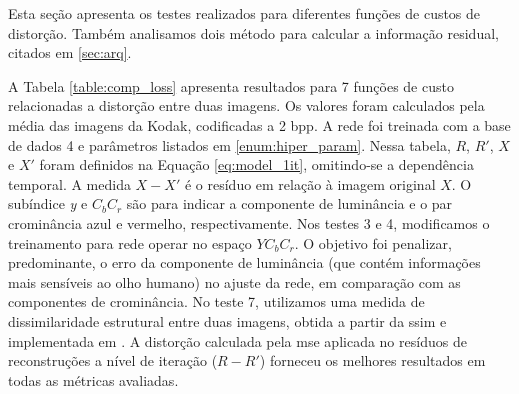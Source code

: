 Esta seção apresenta os testes realizados para diferentes funções de custos de distorção. Também analisamos dois método para calcular a informação residual, citados em \ref{sec:arq}.    


A Tabela \ref{table:comp_loss} apresenta resultados para 7 funções de custo relacionadas a distorção entre duas imagens.  Os valores foram calculados pela média das imagens da Kodak, codificadas a 2 bpp. A rede foi treinada com a base de dados 4 e parâmetros listados em \ref{enum:hiper_param}. Nessa tabela, $R$, $R'$, $X$ e $X'$ foram definidos na Equação \ref{eq:model_1it}, omitindo-se a dependência temporal. A medida $X-X'$ é o resíduo em relação à imagem original $X$.  
O subíndice \textit{y} e \textit{$C_bC_r$} são para indicar a componente de luminância e o par crominância azul e vermelho, respectivamente. Nos testes 3 e 4, modificamos o treinamento para rede operar no espaço $YC_bC_r$. O objetivo foi penalizar, predominante, o erro da componente de luminância (que contém informações mais sensíveis ao olho humano) no ajuste da rede, em comparação com as componentes de crominância.
No teste 7, utilizamos uma medida de dissimilaridade estrutural entre duas imagens, obtida a partir da \acrshort{ssim} e implementada em \cite{su2017}.  A distorção calculada pela \acrshort{mse} aplicada no resíduos de reconstruções a nível de iteração ($R-R'$) forneceu os melhores resultados em todas as métricas avaliadas. 


